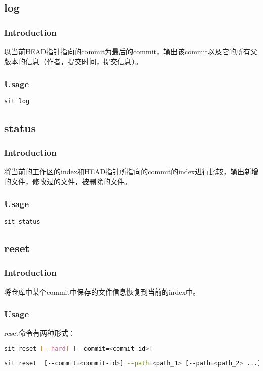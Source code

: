 \documentclass[11pt, a4paper, UTF8]{ctexart}
\begin{document}
\subsection{log}
\subsubsection{Introduction}
以当前HEAD指针指向的commit为最后的commit，输出该commit以及它的所有父版本的信息（作者，提交时间，提交信息）。
\subsubsection{Usage}
\begin{lstlisting}[language=sh,basicstyle=\small\YaHeiMono,numbers=none]
sit log
\end{lstlisting}

\subsection{status}
\subsubsection{Introduction}
将当前的工作区的index和HEAD指针所指向的commit的index进行比较，输出新增的文件，修改过的文件，被删除的文件。
\subsubsection{Usage}
\begin{lstlisting}[language=sh,basicstyle=\small\YaHeiMono,numbers=none]
sit status
\end{lstlisting}

\subsection{reset}
\subsubsection{Introduction}
将仓库中某个commit中保存的文件信息恢复到当前的index中。
\subsubsection{Usage}
reset命令有两种形式：
\begin{lstlisting}[language=sh,basicstyle=\small\YaHeiMono,numbers=none]
sit reset [--hard] [--commit=<commit-id>]
\end{lstlisting}
\begin{lstlisting}[language=sh,basicstyle=\small\YaHeiMono,numbers=none]
sit reset  [--commit=<commit-id>] --path=<path_1> [--path=<path_2> ...]
\end{lstlisting}
\end{document}
